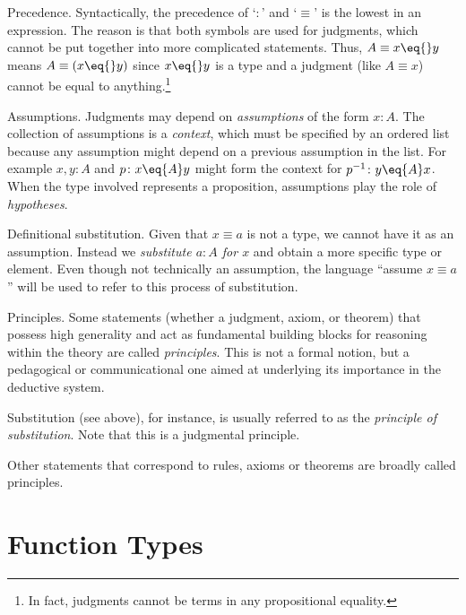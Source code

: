 \begin{lpar}{Precedence.}
    Syntactically, the precedence of `$:$' and `$\equiv$' is the lowest in an expression. The reason is that both symbols are used for judgments, which cannot be put together into more complicated statements. Thus, $A\equiv x\eq{}y$ means $A\equiv(x\eq{}y)$ since $x\eq{}y$ is a type and a judgment (like $A\equiv x$) cannot be equal to anything.\footnote{In fact, judgments cannot be terms in any propositional equality.}
\end{lpar}

\begin{lpar}{Assumptions.}\label{lpar:assumptions}
    Judgments may depend on \textsl{assumptions} of the form $x\colon A$. The collection of assumptions is a \textsl{context}, which must be specified by an ordered list because any assumption might depend on a previous assumption in the list. For example $x,y\colon A$ and $p\colon x\eq{A} y$ might form the context for $p^{-1}\colon y\eq{A} x$. When the type involved represents a proposition, assumptions play the role of \textit{hypotheses}.
\end{lpar}

\begin{lpar}{Definitional substitution.}\label{lpar:definitional-substitution}
    Given that $x\equiv a$ is not a type, we cannot have it as an assumption. Instead we \textsl{substitute $a\colon A$ for $x$} and obtain a more specific type or element. Even though not technically an assumption, the language ``assume $x\equiv a$'' will be used to refer to this process of substitution.
\end{lpar}

\begin{lpar}{Principles.}
    Some statements (whether a judgment, axiom, or theorem) that possess high generality and act as fundamental building blocks for reasoning within the theory are called \textsl{principles}. This is not a formal notion, but a pedagogical or communicational one aimed at underlying its importance in the deductive system.

    Substitution (see above), for instance, is usually referred to as the \textit{principle of substitution}. Note that this is a judgmental principle.

    Other statements that correspond to rules, axioms or theorems are broadly called principles.
\end{lpar}

\section{Function Types}

